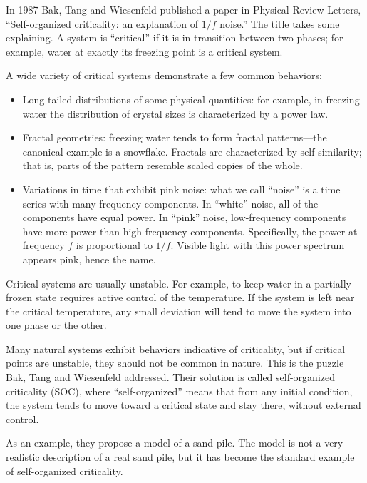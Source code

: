 \documentclass[10pt]{book}
\begin{document}
In 1987 Bak, Tang and Wiesenfeld published a paper in Physical Review
Letters, ``Self-organized criticality: an explanation of $1/f$ noise.''
The title takes some explaining.  A system is ``critical'' if it is
in transition between two phases; for example, water at exactly
its freezing point is a critical system.

A wide variety of critical systems demonstrate a few common
behaviors:

\begin{itemize}

\item Long-tailed distributions of some physical quantities: for
  example, in freezing water the distribution of crystal sizes is
  characterized by a power law.

\item Fractal geometries: freezing water tends to form fractal
  patterns---the canonical example is a snowflake.  Fractals
  are characterized by self-similarity; that is, parts of the
  pattern resemble scaled copies of the whole.

\item Variations in time that exhibit pink noise: what we call
  ``noise'' is a time series with many frequency components.  In
  ``white'' noise, all of the components have equal power.  In
  ``pink'' noise, low-frequency components have more power than
  high-frequency components.  Specifically, the power at frequency $f$
  is proportional to $1/f$.  Visible light with this power spectrum
  appears pink, hence the name.

\end{itemize}

Critical systems are usually unstable.  For example, to keep
water in a partially frozen state requires active control of
the temperature.  If the system is left near the critical
temperature, any small deviation will tend to move the system
into one phase or the other.

Many natural systems exhibit behaviors indicative of
criticality, but if critical points are unstable, they should
not be common in nature.  This is the puzzle Bak, Tang and
Wiesenfeld addressed.  Their solution is called self-organized
criticality (SOC), where ``self-organized'' means that from
any initial condition, the system tends to move toward a
critical state and stay there, without external control.

As an example, they propose a model of a sand pile.  The model
is not a very realistic description of a real sand pile, but
it has become the standard example of self-organized criticality.
\end{document}
